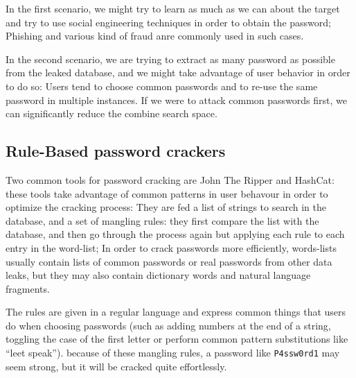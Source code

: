 \documentclass[a4paper,11pt]{article}
\begin{document}
In the first scenario, we might try to learn as much as we can about the target and try to use social engineering techniques in order to obtain the password; Phishing and various kind of fraud anre commonly used in such cases.

In the second scenario, we are trying to extract as many password as possible from the leaked database, and we might take advantage of user behavior in order to do so: Users tend to choose common passwords and to re-use the same password in multiple instances. If we were to attack common passwords first, we can significantly reduce the combine search space.

\subsection{Rule-Based password crackers}

Two common tools for password cracking are John The Ripper and HashCat: these tools take advantage of common patterns in user behavour in order to optimize the cracking process: They are fed a list of strings to search in the database, and a set of mangling rules: they first compare the list with the database, and then go through the process again but applying each rule to each entry in the word-list; In order to crack passwords more efficiently, words-lists usually contain lists of common passwords or real passwords from other data leaks, but they may also contain dictionary words and natural language fragments.

The rules are given in a regular language and express common things that users do when choosing passwords (such as adding numbers at the end of a string, toggling the case of the first letter or perform common pattern substitutions like \enquote{leet speak}). because of these mangling rules, a password like \texttt{P4ssw0rd1} may seem strong, but it will be cracked quite effortlessly.

\cleardoublepage
\thispagestyle{empty}
\printbibliography    
\end{document}
